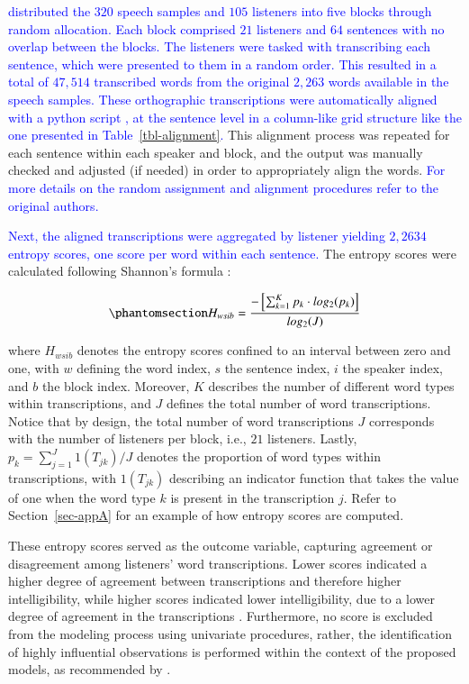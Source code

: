 \documentclass[
  authoryear,
  preprint,
  1p]{elsarticle}
\begin{document}
\textcolor{blue}{\citet{Boonen_et_al_2021} distributed the \(320\) speech samples and
\(105\) listeners into five blocks through random allocation. Each block
comprised \(21\) listeners and \(64\) sentences with no overlap between
the blocks. The listeners were tasked with transcribing each sentence,
which were presented to them in a random order. This resulted in a total
of \(47,514\) transcribed words from the original \(2,263\) words
available in the speech samples. These orthographic transcriptions were
automatically aligned with a python script \citep{Boonen_et_al_2021}, at
the sentence level in a column-like grid structure like the one
presented in Table~\ref{tbl-alignment}.} This alignment process was
repeated for each sentence within each speaker and block, and the output
was manually checked and adjusted (if needed) in order to appropriately
align the words. \textcolor{blue}{For more details on the random assignment and
alignment procedures refer to the original authors.}

\textcolor{blue}{Next, the aligned transcriptions were aggregated by listener yielding
\(2,2634\) entropy scores, one score per word within each sentence.} The
entropy scores were calculated following Shannon's formula
\citeyearpar{Shannon_1948}:

\begin{equation}\phantomsection\label{eq-entropy}{
H_{wsib} = \frac{ -\left[ \sum_{k=1}^{K}  p_{k} \cdot log_{2}(p_{k}) \right] }{ log_{2}(J)}
}\end{equation}

where \(H_{wsib}\) denotes the entropy scores confined to an interval
between zero and one, with \(w\) defining the word index, \(s\) the
sentence index, \(i\) the speaker index, and \(b\) the block index.
Moreover, \(K\) describes the number of different word types within
transcriptions, and \(J\) defines the total number of word
transcriptions. Notice that by design, the total number of word
transcriptions \(J\) corresponds with the number of listeners per block,
i.e., \(21\) listeners. Lastly, \(p_{k} = \sum_{j=1}^{J} 1(T_{jk}) / J\)
denotes the proportion of word types within transcriptions, with
\(1(T_{jk})\) describing an indicator function that takes the value of
one when the word type \(k\) is present in the transcription \(j\).
Refer to Section~\ref{sec-appA} for an example of how entropy scores are
computed.

These entropy scores served as the outcome variable, capturing agreement
or disagreement among listeners' word transcriptions. Lower scores
indicated a higher degree of agreement between transcriptions and
therefore higher intelligibility, while higher scores indicated lower
intelligibility, due to a lower degree of agreement in the
transcriptions \citep{Boonen_et_al_2021, Faes_et_al_2022}. Furthermore,
no score is excluded from the modeling process using univariate
procedures, rather, the identification of highly influential
observations is performed within the context of the proposed models, as
recommended by \citet{McElreath_2020}.
\end{document}
